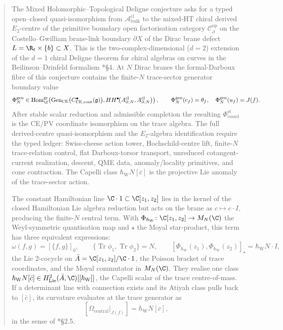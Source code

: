 \begin{abstract}
\medskip\noindent
The Mixed Holomorphic--Topological Deligne conjecture asks for a
typed open--closed quasi-isomorphism from
\(\mathcal A^{\mathrm{cl}}_{\mathrm{bulk}}\) to the mixed-HT chiral
derived \(E_2\)-centre of the primitive boundary open factorisation
category \(\mathcal C^{\mathrm{op}}_\partial\) on the
Costello--Gwilliam brane-link boundary \(\partial X\) of the Dirac
brane defect \(L=\R_t\times\{b\}\subset X\).  This is the
two-complex-dimensional (\(d=2\)) extension of the \(d=1\) chiral
Deligne theorem for chiral algebras on curves in the
Beilinson--Drinfeld formalism
\cite{beilinson-drinfeld-chiral}*{\S 4}.  At \(N\) Dirac branes the
formal-Darboux fibre of this conjecture contains the finite-\(N\)
trace-sector generator boundary value
\[
  \Phi_N^{\mathrm{gen}}\in
  \operatorname{Hom}^{\mathrm{gr}}_\C\!\left(
  \operatorname{Gen}_{\mathrm{CE}}
  \bigl(C^\bullet_{\mathrm{CE},\mathrm{cont}}(\mathfrak g)\bigr),
  HH^\bullet\!\bigl(A^{\mathrm{cl}}_{\partial,N},
                 A^{\mathrm{cl}}_{\partial,N}\bigr)
  \right),
  \qquad
  \Phi_N^{\mathrm{gen}}(c_f)=\theta_f,\quad
  \Phi_N^{\mathrm{gen}}(u_f)=J(f).
\]
After stable scalar reduction and admissible completion the resulting
\(\Phi_{\mathrm{coord}}^{\mathrm{st}}\) is the CE/PV coordinate
isomorphism on the trace algebra.  The full
derived-centre quasi-isomorphism and the \(E_2\)-algebra identification
require the typed ledger: Swiss-cheese action tower, Hochschild-centre
lift, finite-\(N\) trace-relation control, flat Darboux-torsor
transport, unreduced cotangent-current realization, descent, QME data,
anomaly/locality primitives, and cone contraction.  The Capelli class
\(\hbar_{\mathrm{W}}N[\bar c]\) is the projective
Lie anomaly of the trace-sector action.

\medskip\noindent
The constant Hamiltonian line $\C\cdot 1\subset\C[z_1,z_2]$ lies
in the kernel of the closed Hamiltonian Lie algebra reduction but
acts on the brane as $c\mapsto c\cdot I$, producing the finite-$N$
central term.  With $\Phi_{\hbar_{\mathrm{W}}}\colon\C[z_1,z_2]\to M_N(\C)$ the
Weyl-symmetric quantisation map and $\star$ the Moyal star-product,
this term has three equivalent expressions:
\[
  \omega(f,g)=[\{f,g\}]_0,\qquad
  \{\operatorname{Tr}\phi_1,\operatorname{Tr}\phi_2\}=N,\qquad
  [\Phi_{\hbar_{\mathrm{W}}}(z_1),\Phi_{\hbar_{\mathrm{W}}}(z_2)]_\star
    =\hbar_{\mathrm{W}}N\cdot I,
\]
the Lie 2-cocycle on $\bar A=\C[z_1,z_2]/\C\cdot 1$, the Poisson
bracket of trace coordinates, and the Moyal commutator in
$M_N(\C)$.  They realise one class
$\hbar_{\mathrm{W}}N[\bar c]\in H^2_{\mathrm{Lie}}(\bar A,\C)[[\hbar_{\mathrm{W}}]]$, the
Capelli scalar of the trace centre-of-mass.  If a determinant line
with connection exists and its Atiyah class pulls back to
$[\bar c]$, its curvature evaluates at the trace generator as
\[
  [\Omega_{\mathrm{central}}|_{J(f)}]=\hbar_{\mathrm{W}}N[\bar c],
\]
in the sense of \cite{beilinson-drinfeld-chiral}*{\S 2.5}.


\end{abstract}
